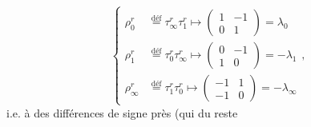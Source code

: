 \[
\left\{\begin{aligned}
\rho_0^r&\overset{\mathrm{déf}}{=}\tau_\infty^r\tau_1^r\mapsto\begin{pmatrix}1&-1\\0&1\end{pmatrix}=\lambda_0\\
\rho_1^r&\overset{\mathrm{déf}}{=}\tau_0^r\tau_\infty^r\mapsto\begin{pmatrix}0&-1\\1&0\end{pmatrix}=-\lambda_1\\
\rho_\infty^r&\overset{\mathrm{déf}}{=}\tau_1^r\tau_0^r\mapsto\begin{pmatrix}-1&1\\-1&0\end{pmatrix}=-\lambda_\infty
\end{aligned}\right.,\tag*{(83)}
\]
i.e. à des différences de signe près (qui du reste
